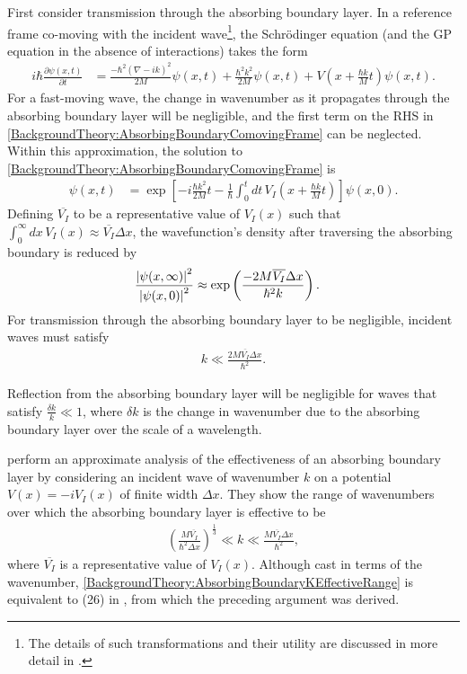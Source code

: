 First consider transmission through the absorbing boundary layer. In a reference frame co-moving with the incident wave\footnote{The details of such transformations and their utility are discussed in more detail in .}, the Schrödinger equation (and the GP equation in the absence of interactions) takes the form
\begin{align}
    \label{BackgroundTheory:AbsorbingBoundaryComovingFrame}
    i \hbar \frac{\partial \psi(x, t)}{\partial t} & = \frac{-\hbar^2\left(\nabla - i k\right)^2}{2M} \psi(x, t) + \frac{\hbar^2 k^2}{2M} \psi(x, t) + V\left(x + \frac{\hbar k}{M}t\right)\psi(x, t).
\end{align}
For a fast-moving wave, the change in wavenumber as it propagates through the absorbing boundary layer will be negligible, and the first term on the RHS in \eqref{BackgroundTheory:AbsorbingBoundaryComovingFrame} can be neglected. Within this approximation, the solution to \eqref{BackgroundTheory:AbsorbingBoundaryComovingFrame} is
\begin{align}
    \psi(x, t) &= \exp\left[-i\frac{\hbar k^2}{2M} t -\frac{1}{\hbar} \int_{0}^t dt\, V_I\left(x + \frac{\hbar k}{M} t\right)\right]\psi(x, 0).
\end{align}
Defining $\overline{V_I}$ to be a representative value of $V_I(x)$ such that $\displaystyle\int_0^\infty dx\, V_I(x)\approx \overline{V_I} \Delta x$, the wavefunction's density after traversing the absorbing boundary is reduced by
\begin{align}
    \frac{\left|\psi(x, \infty)\right|^2}{\left|\psi(x, 0)\right|^2} &\approx \exp\left( \frac{-2M \overline{V_I} \Delta x}{\hbar^2 k} \right) .
\end{align}
For transmission through the absorbing boundary layer to be negligible, incident waves must satisfy
\begin{align}
    \label{BackgroundTheory:AbsorbingBoundaryMaximumK}
    k \ll \frac{2 M \overline{V_I} \Delta x}{\hbar^2}.
\end{align}

Reflection from the absorbing boundary layer will be negligible for waves that satisfy $\displaystyle \frac{\delta k}{k} \ll 1$, where $\delta k$ is the change in wavenumber due to the absorbing boundary layer over the scale of a wavelength. 




 \citet{Neuhasuer:1989} perform an approximate analysis of the effectiveness of an absorbing boundary layer by considering an incident wave of wavenumber $k$ on a potential $V(x) = -i V_I(x)$ of finite width $\Delta x$. They show the range of wavenumbers over which the absorbing boundary layer is effective to be
\begin{align}
    \label{BackgroundTheory:AbsorbingBoundaryKEffectiveRange}
    \left( \frac{M \overline{V_I}}{\hbar^2 \Delta x}\right)^{\frac{1}{3}} \ll k \ll \frac{M \overline{V_I} \Delta x}{\hbar^2},
\end{align}
where $\overline{V_I}$ is a representative value of $V_I(x)$. Although cast in terms of the wavenumber, \eqref{BackgroundTheory:AbsorbingBoundaryKEffectiveRange} is equivalent to (26) in \citep{Neuhasuer:1989}, from which the preceding argument was derived.

